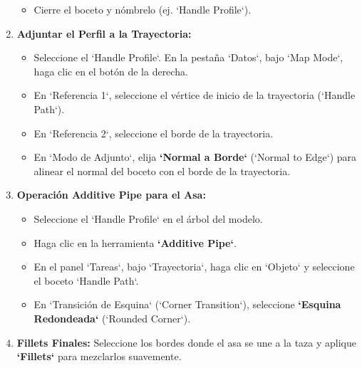 \documentclass[12pt]{article}
\begin{document}
\begin{enumerate}[label=\arabic*)]
\begin{itemize}[label=\textendash]
        \item Cierre el boceto y nómbrelo (ej. `Handle Profile`).
    \end{itemize}
    \item \textbf{Adjuntar el Perfil a la Trayectoria:}
    \begin{itemize}[label=\textendash]
        \item Seleccione el `Handle Profile`. En la pestaña `Datos`, bajo `Map Mode`, haga clic en el botón de la derecha.
        \item En `Referencia 1`, seleccione el vértice de inicio de la trayectoria (`Handle Path`).
        \item En `Referencia 2`, seleccione el borde de la trayectoria.
        \item En `Modo de Adjunto`, elija \textbf{`Normal a Borde`} (`Normal to Edge`) para alinear el normal del boceto con el borde de la trayectoria.
    \end{itemize}
    \item \textbf{Operación Additive Pipe para el Asa:}
    \begin{itemize}[label=\textendash]
        \item Seleccione el `Handle Profile` en el árbol del modelo.
        \item Haga clic en la herramienta \textbf{`Additive Pipe`}.
        \item En el panel `Tareas`, bajo `Trayectoria`, haga clic en `Objeto` y seleccione el boceto `Handle Path`.
        \item En `Transición de Esquina` (`Corner Transition`), seleccione \textbf{`Esquina Redondeada`} (`Rounded Corner`).
    \end{itemize}
    \item \textbf{Fillets Finales:} Seleccione los bordes donde el asa se une a la taza y aplique \textbf{`Fillets`} para mezclarlos suavemente.
\end{enumerate}
\end{document}
